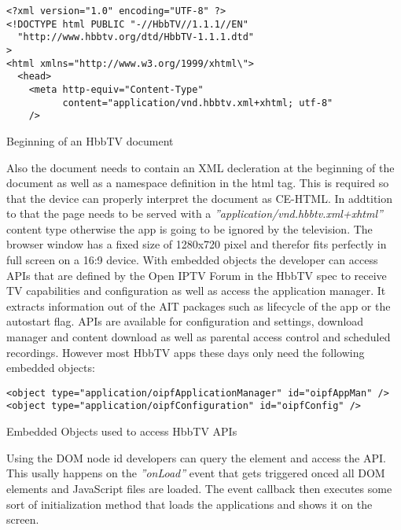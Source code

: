 \vspace{1cm}
\begin{listing}[H]
\begin{verbatim}
<?xml version="1.0" encoding="UTF-8" ?>
<!DOCTYPE html PUBLIC "-//HbbTV//1.1.1//EN"
  "http://www.hbbtv.org/dtd/HbbTV-1.1.1.dtd"
>
<html xmlns="http://www.w3.org/1999/xhtml\">
  <head>
    <meta http-equiv="Content-Type"
          content="application/vnd.hbbtv.xml+xhtml; utf-8"
    />
\end{verbatim}
\caption{Beginning of an HbbTV document}
\label{lst:doctype}
\end{listing}
\vspace{0.5cm}

Also the document needs to contain an XML decleration at the beginning of the document as well
as a namespace definition in the html tag. This is required so that the device can properly
interpret the document as CE-HTML. In addtition to that the page needs to be served with a
\textit{''application/vnd.hbbtv.xml+xhtml''} content type otherwise the app is going to be
ignored by the television. The browser window has a fixed size of 1280x720 pixel and therefor
fits perfectly in full screen on a 16:9 device. With embedded objects the developer can access
APIs that are defined by the Open IPTV Forum in the HbbTV spec to receive TV capabilities
and configuration as well as access the application manager. It extracts information out of
the AIT packages such as lifecycle of the app or the autostart flag. APIs are available for
configuration and settings, download manager and content download as well as parental access
control and scheduled recordings. However most HbbTV apps these days only need the following
embedded objects:

\vspace{1cm}
\begin{listing}[H]
\begin{verbatim}
<object type="application/oipfApplicationManager" id="oipfAppMan" />
<object type="application/oipfConfiguration" id="oipfConfig" />
\end{verbatim}
\caption{Embedded Objects used to access HbbTV APIs}
\label{lst:embeddedObjects}
\end{listing}
\vspace{0.5cm}

Using the DOM node id developers can query the element and access the API. This usally happens
on the \textit{''onLoad''} event that gets triggered onced all DOM elements and JavaScript files
are loaded. The event callback then executes some sort of initialization method that loads the
applications and shows it on the screen.

